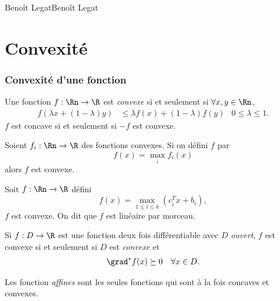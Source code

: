 
\usepackage{multirow}

{Benoît Legat}{Benoît Legat}

\newcommand{\libre}{\ensuremath{\textrm{ libre}}}
\newcommand{\redcost}{\tilde{c}} %
\newcommand{\xopt}{\ensuremath{x^*}}
\newcommand{\adset}{\mathcal{D}}
\newcommand{\eqset}{\mathcal{E}}
\newcommand{\inset}{\mathcal{I}}
\newcommand{\acset}{\mathcal{A}}
\newcommand{\lagr}{\mathcal{L}}
\newcommand{\dset}{\mathcal{C}}
\newcommand{\polye}{\mathcal{P}}
\newcommand{\assign}{\leftarrow}

\part{Convexité}
\section{Convexité d'une fonction}
\begin{mydef}
  Une fonction $f: \Rn \to \R$ est \emph{convexe} si et seulement si
  $\forall x, y \in \Rn$,
  \begin{align*}
    f(\lambda x + (1-\lambda)y) & \leq
    \lambda f(x) + (1-\lambda)f(y) & 0 \leq \lambda \leq 1.
  \end{align*}
  $f$ est concave si et seulement si $-f$ est convexe.
\end{mydef}

\begin{myprop}
  Soient $f_i: \Rn \to \R$ des fonctions convexes.
  Si on défini $f$ par
  \[ f(x) = \max_i f_i(x) \]
  alors $f$ est convexe.
\end{myprop}
\begin{myprop}
  Soit $f: \Rn \to \R$ défini
  \[ f(x) = \max_{1 \leq i \leq k}(c_i^Tx + b_i), \]
  $f$ est convexe.
  On dit que $f$ est linéaire par morceau.
\end{myprop}

\begin{myprop}
  Si $f:D\to\R$ est une fonction deux fois différentiable
  avec $D$ \emph{ouvert},
  $f$ est convexe si et seulement si $D$ est \emph{convexe} et
  \begin{align*}
    \grad^* f(x) & \succeq 0 & \forall x \in D.
  \end{align*}
\end{myprop}

\begin{myprop}
  Les fonction \emph{affines} sont les seules fonctions qui sont à la fois
  concaves et convexes.
\end{myprop}

